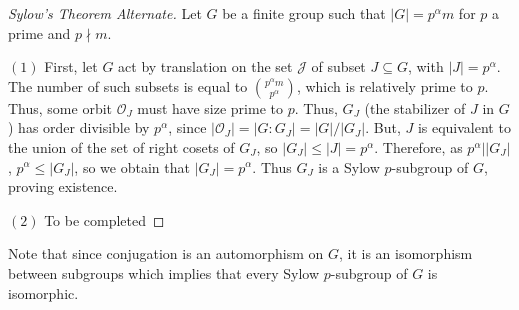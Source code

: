 \begin{proof}[Sylow's Theorem Alternate]
    Let $G$ be a finite group such that $|G| = p^{\alpha}m$ for $p$ a prime and $p\nmid m$. 

    $(1)$ First, let $G$ act by translation on the set $\mathcal{J}$ of subset $J \subseteq G$, with $|J| = p^{\alpha}$. The number of such subsets is equal to $\binom{p^{\alpha}m}{p^{\alpha}}$, which is relatively prime to $p$. Thus, some orbit $\mathcal{O}_J$ must have size prime to $p$. Thus, $G_J$ (the stabilizer of $J$ in $G$) has order divisible by $p^{\alpha}$, since $|\mathcal{O}_J| = |G:G_J| = |G|/|G_J|$. But, $J$ is equivalent to the union of the set of right cosets of $G_J$, so $|G_J|\leq |J| = p^{\alpha}$. Therefore, as $p^{\alpha}\vert|G_J|$, $p^{\alpha}\leq |G_J|$, so we obtain that $|G_J| = p^{\alpha}$. Thus $G_J$ is a Sylow $p$-subgroup of $G$, proving existence.


    $(2)$ To be completed 
\end{proof}

Note that since conjugation is an automorphism on $G$, it is an isomorphism between subgroups which implies that every Sylow $p$-subgroup of $G$ is isomorphic.


